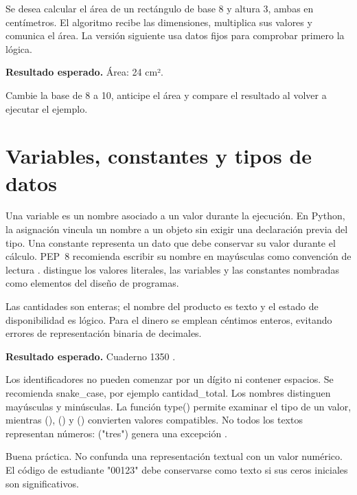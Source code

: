 
Se desea calcular el área de un rectángulo de base 8 y altura 3, ambas en centímetros. El algoritmo recibe las dimensiones, multiplica sus valores y comunica el área. La versión siguiente usa datos fijos para comprobar primero la lógica.


\textbf{Resultado esperado.} Área: 24 cm².



Cambie la base de 8 a 10, anticipe el área y compare el resultado al volver a ejecutar el ejemplo.

\section{Variables, constantes y tipos de datos}

Una variable es un nombre asociado a un valor durante la ejecución. En Python, la asignación vincula un nombre a un objeto sin exigir una declaración previa del tipo. Una constante representa un dato que debe conservar su valor durante el cálculo. PEP~8 recomienda escribir su nombre en mayúsculas como convención de lectura \parencite{pep8}. \textcite[cap.~2]{farrell2013} distingue los valores literales, las variables y las constantes nombradas como elementos del diseño de programas.




Las cantidades son enteras; el nombre del producto es texto y el estado de disponibilidad es lógico. Para el dinero se emplean céntimos enteros, evitando errores de representación binaria de decimales.


\textbf{Resultado esperado.} Cuaderno 1350 .

Los identificadores no pueden comenzar por un dígito ni contener espacios. Se recomienda snake\_case, por ejemplo cantidad\_total. Los nombres distinguen mayúsculas y minúsculas. La función type() permite examinar el tipo de un valor, mientras (), () y () convierten valores compatibles. No todos los textos representan números: ("tres") genera una excepción .

Buena práctica. No confunda una representación textual con un valor numérico. El código de estudiante "00123" debe conservarse como texto si sus ceros iniciales son significativos.

